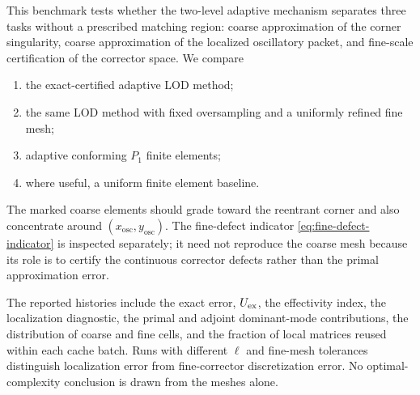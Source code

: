 This benchmark tests whether the two-level adaptive mechanism separates
three tasks without a prescribed matching region: coarse approximation of
the corner singularity, coarse approximation of the localized oscillatory
packet, and fine-scale certification of the corrector space.  We compare
\begin{enumerate}
\item the exact-certified adaptive LOD method;
\item the same LOD method with fixed oversampling and a uniformly refined
      fine mesh;
\item adaptive conforming $P_1$ finite elements;
\item where useful, a uniform finite element baseline.
\end{enumerate}
The marked coarse elements should grade toward the reentrant corner and
also concentrate around $(x_{\mathrm{osc}},y_{\mathrm{osc}})$.  The
fine-defect indicator \eqref{eq:fine-defect-indicator} is inspected
separately; it need not reproduce the coarse mesh because its role is to
certify the continuous corrector defects rather than the primal
approximation error.

The reported histories include the exact error, $U_{\mathrm{ex}}$, the effectivity
index, the localization diagnostic, the primal and adjoint dominant-mode
contributions, the distribution of coarse and fine cells, and the fraction
of local matrices reused within each cache batch.  Runs with different
$\ell$ and fine-mesh tolerances distinguish localization error from
fine-corrector discretization error.  No optimal-complexity conclusion is
drawn from the meshes alone.



